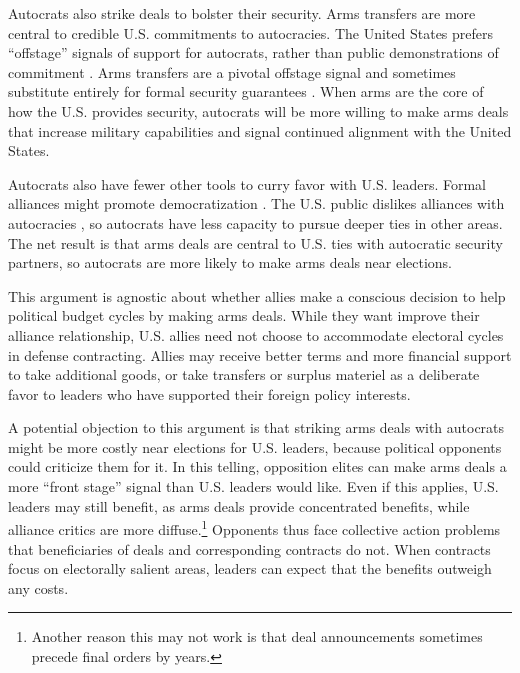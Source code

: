 \documentclass[12pt]{article}
\begin{document}
Autocrats also strike deals to bolster their security.
Arms transfers are more central to credible U.S. commitments to autocracies.  
The United States prefers ``offstage'' signals of support for autocrats, rather than public demonstrations of commitment \citep{McManusYarhi-Milo2017}.
Arms transfers are a pivotal offstage signal and sometimes substitute entirely for formal security guarantees \citep{Yarhi-Miloetal2016}. 
When arms are the core of how the U.S. provides security, autocrats will be more willing to make arms deals that increase military capabilities and signal continued alignment with the United States.


Autocrats also have fewer other tools to curry favor with U.S. leaders.
Formal alliances might promote democratization \citep{GiblerWolford2006, Warren2016}.
The U.S. public dislikes alliances with autocracies \citep{Alley2022}, so autocrats have less capacity to pursue deeper ties in other areas. 
The net result is that arms deals are central to U.S. ties with autocratic security partners, so autocrats are more likely to make arms deals near elections. 


This argument is agnostic about whether allies make a conscious decision to help political budget cycles by making arms deals.
While they want improve their alliance relationship, U.S. allies need not choose to accommodate electoral cycles in defense contracting.
Allies may receive better terms and more financial support to take additional goods, or take transfers or surplus materiel as a deliberate favor to leaders who have supported their foreign policy interests. 


A potential objection to this argument is that striking arms deals with autocrats might be more costly near elections for U.S. leaders, because political opponents could criticize them for it. 
In this telling, opposition elites can make arms deals a more ``front stage'' signal than U.S. leaders would like. 
Even if this applies, U.S. leaders may still benefit, as arms deals provide concentrated benefits, while alliance critics are more diffuse.\footnote{Another reason this may not work is that deal announcements sometimes precede final orders by years.}
Opponents thus face collective action problems that beneficiaries of deals and corresponding contracts do not. 
When contracts focus on electorally salient areas, leaders can expect that the benefits outweigh any costs. 
\end{document}
